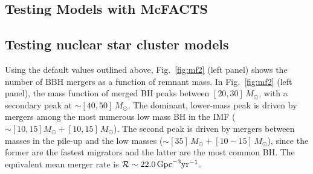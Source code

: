 \subsection{Testing Models with McFACTS}
\label{sec:mcfacts-testing}

\subsection{Testing nuclear star cluster models}
Using the default values outlined above, Fig.~\ref{fig:mf2} (left panel) shows the number of BBH mergers as a function of remnant mass.
In Fig.~\ref{fig:mf2} (left panel), the mass function of merged BH peaks between $[20,30]\,M_{\odot}$, with a secondary peak at $\sim [40,50]\,M_{\odot}$. The dominant, lower-mass peak is driven by mergers among the most numerous low mass BH in the IMF ($\sim [10,15]M_{\odot}+[10,15]\,M_{\odot}$). The second peak is driven by mergers between masses in the pile-up and the low masses ($\sim [35]\,M_{\odot} + [10-15]\,M_{\odot}$), since the former are the fastest migrators and the latter are the most common BH. The equivalent mean merger rate is $\mathcal{R}\sim 22.0\,{\rm Gpc}^{-3}{\rm yr}^{-1}$.

